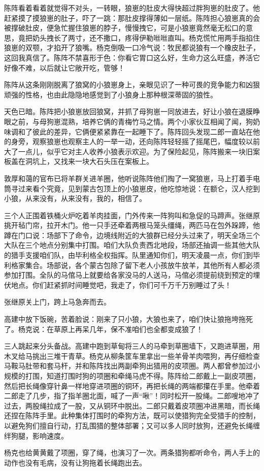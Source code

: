 \par 陈阵看着看着就觉得不对头，一转眼，狼崽的肚皮大得快超过胖狗崽的肚皮了。他赶紧摸了摸狼崽的肚子，吓了一跳：那肚皮撑得薄如一层纸。陈阵担心狼崽真的会被撑破肚皮，便急忙握住狼崽的脖子，慢慢拽它，可是小狼崽竟然毫无松口的意思，竟把奶头拽长了两寸，还不撒口，疼得伊勒咝咝直叫。杨克慌忙用两手指掐住狼崽的双颚，才掐开了狼嘴。杨克倒吸一口冷气说：牧民都说狼有一个橡皮肚子，这回我真信了。陈阵不禁喜形于色：你看它胃口这么好，生命力这么旺盛，养活它好像不难，以后就让它敞开吃，管够！
\par 陈阵从这条刚刚脱离了狼窝的小狼崽身上，亲眼见识了一种可畏的竞争能力和凶狠顽强的性格，也由此隐隐地感觉到了小狼身上那种根深蒂固的狼性。
\par 
\par 天色已暗。陈阵把小狼崽放回狼窝，并抓了母狗崽一同放进去，好让小狼在退膜睁眼之前，与母狗崽混熟，培养它俩的青梅竹马之情。两个小家伙互相闻了闻，狗奶味调和了彼此的差异，它俩便紧紧靠在一起睡下了。陈阵回头发现二郎一直站在他的身旁，观察狼崽也观察主人的一举一动，还向陈阵轻轻摇了摇尾巴，幅度较以前大了一点儿，似乎它对主人收养小狼表示欢迎。为了保险起见，陈阵搬来一块旧案板盖在洞坑上，又找来一块大石头压在案板上。
\par 敦厚和蔼的官布已将羊群关进羊圈，他听说陈阵他们掏了一窝狼崽，马上打着手电筒寻过来看个究竟，见到蒙古包顶上的小狼崽皮，他吃惊地说：在额仑，汉人挖到小狼，从来没有，从来没有，我的，相信了。
\par 三个人正围着铁桶火炉吃着羊肉挂面，门外传来一阵狗叫和急促的马蹄声。张继原挑开毡门帘，拉开木门。他一只手还牵着两根马笼头缰绳，两匹马在包外跺蹄，他蹲在门口说：场部下了命令，边境线附近的大狼群已经分头过来了，明天全场三个大队在三个地点分别集中打围。咱们大队负责西北地段，场部还抽调一些其他大队的猎手支援咱们队，由毕利格全权指挥。队里通知你们，明天凌晨一点，你们到毕利格家集合。场部说，各个蒙古包除了留下老人小孩放牛放羊，其他所有人都必须参加打围。全队的马倌马上就要给各家没马的人送马，马倌必须提前绕到预定的埋伏地点。你们赶紧抓时间睡觉吧，我走了，你们可千万千万别睡过了头！
\par 张继原关上门，跨上马急奔而去。
\par 高建中放下饭碗，苦着脸说：刚来了只小狼，大狼也来了，咱们快让狼拖垮拖死了。杨克说：在草原上再呆几年，保不准咱们也全都变成狼了！
\par 三人跳起来分头备战。高建中跑到草甸将三人的马牵到草圈墙下，又跑进草圈，用木叉给马挑出三堆干青草。杨克从柳条筐车里拿出一些羊骨羊肉喂狗，再仔细检查马鞍马肚带和套马杆，并和陈阵找出两副牵狗出猎用的皮项圈。两人都曾参加过小规模的打围，知道打围时狗的项圈和牵绳马虎不得。陈阵给二郎戴上一副皮项圈，然后把长绳像穿针鼻一样地穿进项圈的铜环，再把长绳的两端都攥在手里。他牵着二郎走了几步，指了指羊圈北面，喊了一声“啾”！同时松开一股绳。二郎嗖地冲了过去，两股绳拉成了一股，又从铜环中脱出。二郎只戴着皮项圈冲进黑暗，而长绳还捏在陈阵手里。此种集体打围时的牵狗方法，既可以使猎狗完全受猎手的控制，以避免狗们擅自行动，打乱围猎的整体部署；又可以多人同时放狗，还避免长绳缠绊狗腿，影响速度。
\par 杨克也给黄黄戴了项圈，穿了绳，也演习了一次。两条猎狗都听命令，两人手上的动作也没有毛病，没有让狗拖着长绳跑出去。



